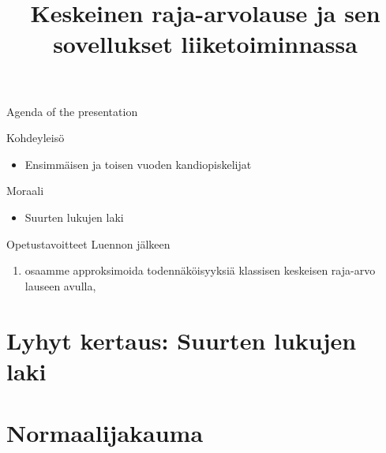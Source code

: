 \documentclass{beamer}
\title{Keskeinen raja-arvolause ja sen sovellukset liiketoiminnassa}
\date{\displaydate{date}}
\begin{document}
\frame{\titlepage}

\begin{frame}{Agenda of the presentation}
\tableofcontents
\end{frame}


\begin{frame}{Kohdeyleisö}
  \begin{itemize}
    \item Ensimmäisen ja toisen vuoden kandiopiskelijat
  \end{itemize}
\end{frame}


\begin{frame}{Moraali}
  \begin{itemize}
    \item Suurten lukujen laki
  \end{itemize}
\end{frame}


\begin{frame}{Opetustavoitteet}
  Luennon jälkeen
  \begin{enumerate}
    \item osaamme approksimoida todennäköisyyksiä klassisen keskeisen raja-arvo
    lauseen avulla,
  \end{enumerate}
\end{frame}





\section{Lyhyt kertaus: Suurten lukujen laki}


\section{Normaalijakauma}
\end{document}
